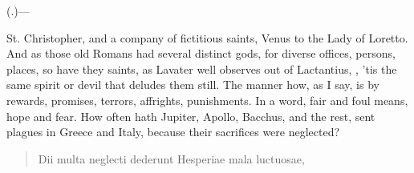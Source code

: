 {(.)---

St. Christopher, and a company of fictitious saints, Venus to the Lady
of Loretto. And as those old Romans had several distinct gods, for
diverse offices, persons, places, so have they saints, as Lavater
well observes out of Lactantius, , 'tis the same
spirit or devil that deludes them still. The manner how, as I say, is
by rewards, promises, terrors, affrights, punishments. In a word, fair
and foul means, hope and fear. How often hath Jupiter, Apollo, Bacchus,
and the rest, sent plagues in Greece and Italy, because their
sacrifices were neglected?

\begin{latin}
\begin{verse}%
Dii multa neglecti dederunt
Hesperiae mala luctuosae,
\end{verse}%
\end{latin}

}
